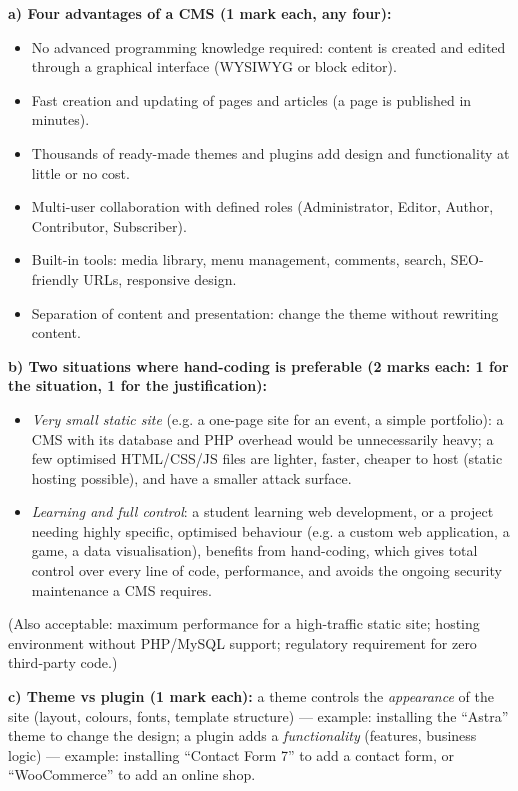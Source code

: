 \documentclass[11pt]{article}
\newcommand{\cle}[1]{{\popxbold\color{popdark}#1}}
\begin{document}
\begin{corrige}
\textbf{a) Four advantages of a CMS (1 mark each, any four):}
\begin{itemize}
\item No advanced programming knowledge required: content is created and edited through a graphical interface (WYSIWYG or block editor).
\item Fast creation and updating of pages and articles (a page is published in minutes).
\item Thousands of ready-made themes and plugins add design and functionality at little or no cost.
\item Multi-user collaboration with defined roles (Administrator, Editor, Author, Contributor, Subscriber).
\item Built-in tools: media library, menu management, comments, search, SEO-friendly URLs, responsive design.
\item Separation of content and presentation: change the theme without rewriting content.
\end{itemize}

\textbf{b) Two situations where hand-coding is preferable (2 marks each: 1 for the situation, 1 for the justification):}
\begin{itemize}
\item \emph{Very small static site} (e.g. a one-page site for an event, a simple portfolio): a CMS with its database and PHP overhead would be unnecessarily heavy; a few optimised HTML/CSS/JS files are lighter, faster, cheaper to host (static hosting possible), and have a smaller attack surface.
\item \emph{Learning and full control}: a student learning web development, or a project needing highly specific, optimised behaviour (e.g. a custom web application, a game, a data visualisation), benefits from hand-coding, which gives total control over every line of code, performance, and avoids the ongoing security maintenance a CMS requires.
\end{itemize}
(Also acceptable: maximum performance for a high-traffic static site; hosting environment without PHP/MySQL support; regulatory requirement for zero third-party code.)

\textbf{c) Theme vs plugin (1 mark each):} a \cle{theme} controls the \emph{appearance} of the site (layout, colours, fonts, template structure) --- example: installing the ``Astra'' theme to change the design; a \cle{plugin} adds a \emph{functionality} (features, business logic) --- example: installing ``Contact Form 7'' to add a contact form, or ``WooCommerce'' to add an online shop.
\end{corrige}
\end{document}
